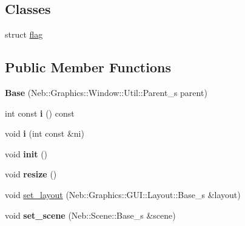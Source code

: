 \subsection*{Classes}
\begin{DoxyCompactItemize}
\item 
struct \hyperlink{structNeb_1_1Graphics_1_1Window_1_1Base_1_1flag}{flag}
\end{DoxyCompactItemize}
\subsection*{Public Member Functions}
\begin{DoxyCompactItemize}
\item 
\hypertarget{classNeb_1_1Graphics_1_1Window_1_1Base_a8e3c37aa30e0a2a2c4998753dfa27a3e}{{\bfseries Base} (Neb\-::\-Graphics\-::\-Window\-::\-Util\-::\-Parent\-\_\-s parent)}\label{classNeb_1_1Graphics_1_1Window_1_1Base_a8e3c37aa30e0a2a2c4998753dfa27a3e}

\item 
\hypertarget{classNeb_1_1Graphics_1_1Window_1_1Base_a2acc151c8ffa7ecab855034adc464feb}{int const {\bfseries i} () const }\label{classNeb_1_1Graphics_1_1Window_1_1Base_a2acc151c8ffa7ecab855034adc464feb}

\item 
\hypertarget{classNeb_1_1Graphics_1_1Window_1_1Base_a33fcc09087f30131f069e2bef4890ad6}{void {\bfseries i} (int const \&ni)}\label{classNeb_1_1Graphics_1_1Window_1_1Base_a33fcc09087f30131f069e2bef4890ad6}

\item 
\hypertarget{classNeb_1_1Graphics_1_1Window_1_1Base_a78d20e60f26c917ed0fb4a2f9c685f6e}{void {\bfseries init} ()}\label{classNeb_1_1Graphics_1_1Window_1_1Base_a78d20e60f26c917ed0fb4a2f9c685f6e}

\item 
\hypertarget{classNeb_1_1Graphics_1_1Window_1_1Base_a16653d78a1cdbabc441bd774e8add7cd}{void {\bfseries resize} ()}\label{classNeb_1_1Graphics_1_1Window_1_1Base_a16653d78a1cdbabc441bd774e8add7cd}

\item 
void \hyperlink{classNeb_1_1Graphics_1_1Window_1_1Base_aea690ebbb5dc402666ee85ca4db832c3}{set\-\_\-layout} (Neb\-::\-Graphics\-::\-G\-U\-I\-::\-Layout\-::\-Base\-\_\-s \&layout)
\item 
\hypertarget{classNeb_1_1Graphics_1_1Window_1_1Base_a9572cb6e29de40b372af17d5a05a3baa}{void {\bfseries set\-\_\-scene} (Neb\-::\-Scene\-::\-Base\-\_\-s \&scene)}\label{classNeb_1_1Graphics_1_1Window_1_1Base_a9572cb6e29de40b372af17d5a05a3baa}


\end{DoxyCompactItemize}
